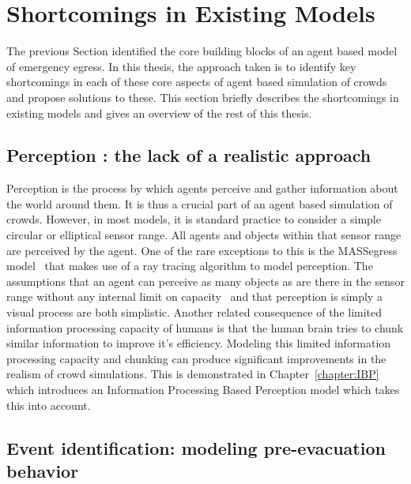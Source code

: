\section{Shortcomings in Existing Models} %
\label{sec:shortcomings_in_existing_models}

The previous Section identified the core building blocks of an agent based model of emergency egress.
In this thesis, the approach taken is to identify key shortcomings in each of these core aspects of agent based simulation of crowds and propose solutions to these. This section briefly describes the shortcomings in existing models and gives an overview of the rest of this thesis.

\subsection{Perception : the lack of a realistic approach}
\label{IBEVAC:PerceptionShortcomings}


    Perception is the process by which agents perceive and gather information about the world around them. It is thus a crucial part of an agent based simulation of crowds. However, in most models, it is standard practice to consider a simple circular or elliptical sensor range. All agents and objects within that sensor range are perceived by the agent. One of the rare exceptions to this is the MASSegress model~\cite{Pan:2006vp} that makes use of a ray tracing algorithm to model perception. The assumptions that an agent can perceive as many objects as are there in the sensor range without any internal limit on capacity~\cite{Miller:1956tr} and that perception is simply a visual process are both simplistic. Another related consequence of the limited information processing capacity of humans is that the human brain tries to chunk similar information to improve it's efficiency. Modeling this limited information processing capacity and chunking can produce significant improvements in the realism of crowd simulations. This is demonstrated in Chapter~\ref{chapter:IBP} which introduces an Information Processing Based Perception model which takes this into account.


\subsection{Event identification: modeling pre-evacuation behavior}
\label{IBEVAC:EventIdentificationShortcomings}


